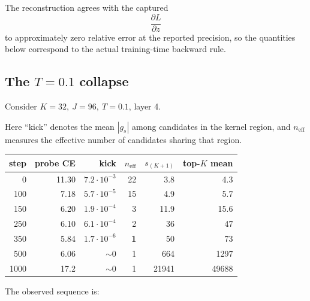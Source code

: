 \documentclass[11pt,a4paper]{article}
\newcommand{\neff}{n_{\mathrm{eff}}}
\begin{document}
The reconstruction agrees with the captured
\[
\frac{\partial L}{\partial z}
\]
to approximately zero relative error at the reported precision, so the
quantities below correspond to the actual training-time backward rule.

\subsection*{The \(T=0.1\) collapse}

Consider \(K=32,\ J=96,\ T=0.1\), layer 4.

Here ``kick'' denotes the mean \(|g_s|\) among candidates in the kernel region,
and \(\neff\) measures the effective number of candidates sharing that region.

\begin{center}\small
\begin{tabular}{rrrrrr}
\toprule
step & probe CE & kick & \(\neff\) & \(s_{(K+1)}\) & top-\(K\) mean \\
\midrule

0    & 11.30 & \(7.2\cdot10^{-3}\) & 22 & 3.8   & 4.3 \\
100  & 7.18  & \(5.7\cdot10^{-5}\) & 15 & 4.9   & 5.7 \\
150  & 6.20  & \(1.9\cdot10^{-4}\) & 3  & 11.9  & 15.6 \\
250  & 6.10  & \(6.1\cdot10^{-4}\) & 2  & 36    & 47 \\
350  & 5.84  & \(1.7\cdot10^{-6}\) & \textbf{1} & 50 & 73 \\
500  & 6.06  & \(\sim0\) & 1 & 664 & 1297 \\
1000 & 17.2  & \(\sim0\) & 1 & 21941 & 49688 \\

\bottomrule
\end{tabular}
\end{center}

The observed sequence is:
\end{document}
